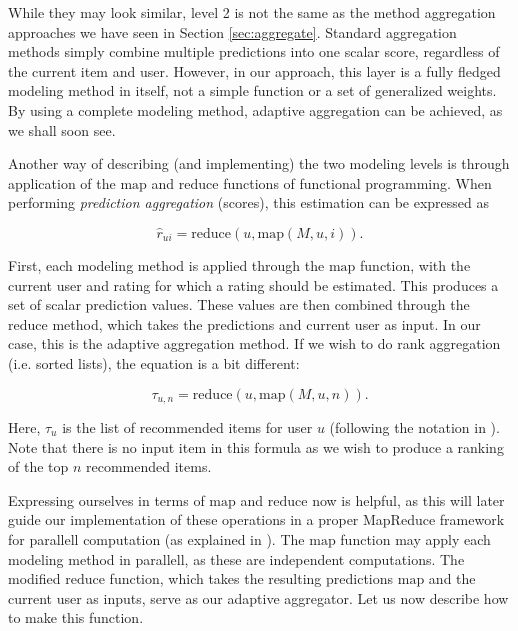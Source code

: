 

While they may look similar, level 2 is not the same as the method aggregation approaches we have seen in Section \ref{sec:aggregate}.
Standard aggregation methods simply combine multiple predictions into one scalar score, regardless of the current item and user.
However, in our approach, this layer is a fully fledged modeling method in itself, not a simple function or a set of generalized weights.
By using a complete modeling method, adaptive aggregation can be achieved, as we shall soon see.

Another way of describing (and implementing) the two modeling levels is through application
of the $\mathrm{map}$ and $\mathrm{reduce}$ functions of functional programming.
When performing \emph{prediction aggregation} (scores), this estimation can be expressed as

\begin{equation*}
  \hat{r}_{ui} = \mathrm{reduce}(u, \mathrm{map}(M,u,i)).
\end{equation*}

First, each modeling method is applied through the $\mathrm{map}$ function, with the current user and rating for which
a rating should be estimated. This produces a set of scalar prediction values. These values are then
combined through the $\mathrm{reduce}$ method, which takes the predictions and current user as input.
In our case, this is the adaptive aggregation method. 
If we wish to do rank aggregation (i.e. sorted lists), the equation is a bit different:

\begin{equation*}
  \tau_{u,n} = \mathrm{reduce}(u, \mathrm{map}(M,u,n)).
\end{equation*}

Here, $\tau_{u}$ is the list of recommended items for user $u$ (following the notation in \citet[p3]{Dwork2001}).
Note that there is no input item in this formula as we wish to produce a ranking of the top $n$ recommended items.

Expressing ourselves in terms of $\mathrm{map}$ and $\mathrm{reduce}$ now is helpful, as this will later
guide our implementation of these operations in a proper MapReduce framework
for parallell computation (as explained in \citet[p75]{Manning2008}).
The $\mathrm{map}$ function may apply each modeling method in parallell, 
as these are independent computations.
The modified $\mathrm{reduce}$ function, which takes the resulting predictions $\mathrm{map}$ and the current
user as inputs, serve as our adaptive aggregator.
Let us now describe how to make this function.


